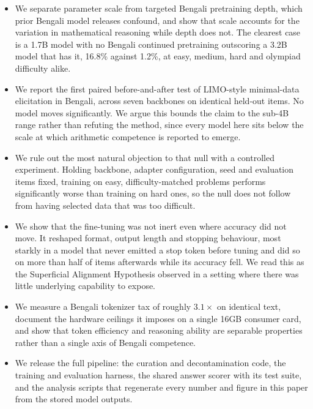 \begin{itemize}
\item We separate parameter scale from targeted Bengali pretraining depth,
      which prior Bengali model releases confound, and show that scale
      accounts for the variation in mathematical reasoning while depth does
      not. The clearest case is a 1.7B model with no Bengali continued
      pretraining outscoring a 3.2B model that has it, 16.8\% against 1.2\%,
      at easy, medium, hard and olympiad difficulty alike.

\item We report the first paired before-and-after test of LIMO-style
      minimal-data elicitation in Bengali, across seven backbones on identical
      held-out items. No model moves significantly. We argue this bounds the
      claim to the sub-4B range rather than refuting the method, since every
      model here sits below the scale at which arithmetic competence is
      reported to emerge.

\item We rule out the most natural objection to that null with a controlled
      experiment. Holding backbone, adapter configuration, seed and evaluation
      items fixed, training on easy, difficulty-matched problems performs
      significantly worse than training on hard ones, so the null does not
      follow from having selected data that was too difficult.

\item We show that the fine-tuning was not inert even where accuracy did not
      move. It reshaped format, output length and stopping behaviour, most
      starkly in a model that never emitted a stop token before tuning and did
      so on more than half of items afterwards while its accuracy fell. We read
      this as the Superficial Alignment Hypothesis observed in a setting where
      there was little underlying capability to expose.

\item We measure a Bengali tokenizer tax of roughly $3.1\times$ on identical
      text, document the hardware ceilings it imposes on a single 16GB
      consumer card, and show that token efficiency and reasoning ability are
      separable properties rather than a single axis of Bengali competence.

\item We release the full pipeline: the curation and decontamination code, the
      training and evaluation harness, the shared answer scorer with its test
      suite, and the analysis scripts that regenerate every number and figure
      in this paper from the stored model outputs.
\end{itemize}


